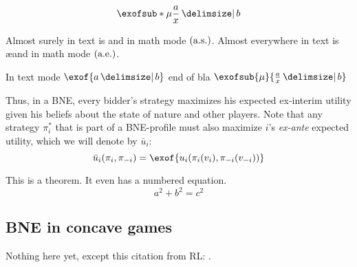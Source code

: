     \begin{equation*}
      \exofsub*{\mu}{\frac{a}{x} \given b}
    \end{equation*}

    Almost surely in text is \as and in math mode $\textup(\textrm{a.s.}\textup)$.
    Almost everywhere in text is \ae and in math mode $\textup(\textrm{a.e.}\textup)$.

    In text mode $\exof{a \given b}$ end of bla $\exofsub{\mu}{\frac{a}{x} \given b}$
    
    Thus, in a BNE, every bidder's strategy maximizes his expected ex-interim utility given his beliefs about the state of nature and other players. Note that any strategy $\pi_i^*$ that is part of a \ac{BNE}-profile must also maximize $i$'s \emph{ex-ante} expected utility, which we will denote by $\bar u_i$:
    $$\bar{u}_i(\pi_i, \pi_{-i}) = \exof{u_i(\pi_i(v_i), \pi_{-i}(v_{-i}))}$$


    \begin{theorem}\label{thm:it}
      This is a theorem. It even has a numbered equation.
      \begin{equation}
        a^2 + b^2 = c^2
      \end{equation}
    \end{theorem}


\subsection{\acf{BNE} in concave games}

Nothing here yet, except this citation from \ac{RL}: \citet{silverDeterministicPolicyGradient2014}.